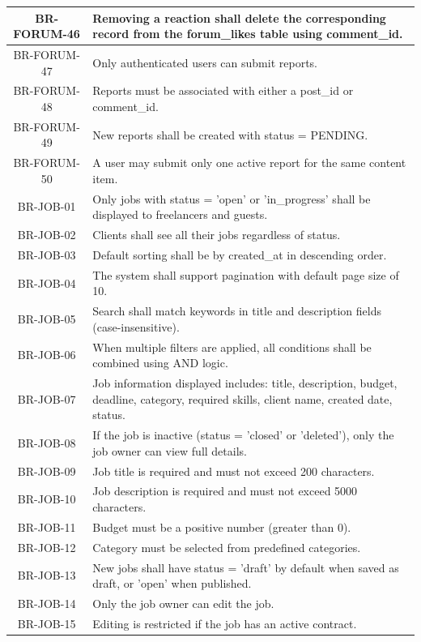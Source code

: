 \begin{longtable}{|c|p{12cm}|}
    BR-FORUM-46 & Removing a reaction shall delete the corresponding record from the forum\_likes table using comment\_id. \\ \hline
    BR-FORUM-47 & Only authenticated users can submit reports. \\ \hline
    BR-FORUM-48 & Reports must be associated with either a post\_id or comment\_id. \\ \hline
    BR-FORUM-49 & New reports shall be created with status = PENDING. \\ \hline
    BR-FORUM-50 & A user may submit only one active report for the same content item. \\ \hline
   BR-JOB-01 & Only jobs with status = 'open' or 'in\_progress' shall be displayed to freelancers and guests. \\ \hline
BR-JOB-02 & Clients shall see all their jobs regardless of status. \\ \hline
BR-JOB-03 & Default sorting shall be by created\_at in descending order. \\ \hline
BR-JOB-04 & The system shall support pagination with default page size of 10. \\ \hline
BR-JOB-05 & Search shall match keywords in title and description fields (case-insensitive). \\ \hline
BR-JOB-06 & When multiple filters are applied, all conditions shall be combined using AND logic. \\ \hline
BR-JOB-07 & Job information displayed includes: title, description, budget, deadline, category, required skills, client name, created date, status. \\ \hline
BR-JOB-08 & If the job is inactive (status = 'closed' or 'deleted'), only the job owner can view full details. \\ \hline
BR-JOB-09 & Job title is required and must not exceed 200 characters. \\ \hline
BR-JOB-10 & Job description is required and must not exceed 5000 characters. \\ \hline
BR-JOB-11 & Budget must be a positive number (greater than 0). \\ \hline
BR-JOB-12 & Category must be selected from predefined categories. \\ \hline
BR-JOB-13 & New jobs shall have status = 'draft' by default when saved as draft, or 'open' when published. \\ \hline
BR-JOB-14 & Only the job owner can edit the job. \\ \hline
BR-JOB-15 & Editing is restricted if the job has an active contract. \\ \hline

\end{longtable}
